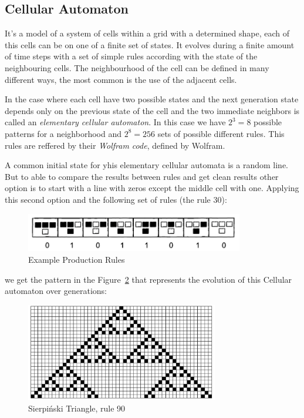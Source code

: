 
\subsection{Cellular Automaton} %
\label{sub:cellular_automaton}

It's a model of a system of cells within a grid with a determined shape, each of this cells can be on one of a finite set of states. It evolves during a finite amount of time steps with a set of simple rules according with the state of the neighbouring cells.
The neighbourhood of the cell can be defined in many different ways, the most common is the use of the adjacent cells. 

In the case where each cell have two possible states and the next generation state depends only on the previous state of the cell and the two immediate neighbors is called an \emph{elementary cellular automaton}. In this case we have $2^3 = 8$ possible patterns for a neighborhood and $2^8 = 256$ sets of possible different rules. This rules are reffered by their \emph{Wolfram code}, defined by Wolfram. 

A common initial state for yhis elementary cellular automata is a random line. But to able to compare the results between rules and get clean results other option is to start with a line with zeros except the middle cell with one. Applying this second option and the following set of rules (the rule 30):

\begin{figure}[htbp]
	\centering
	\includegraphics[width=0.85\textwidth]{img/Theory/Cellular_A/Rules.png}
	\caption{Example Production Rules\cite{Shiffman2012}}
	\label{fig:label}
\end{figure}

we get the pattern in the Figure~\ref{fig:resultCA} that represents the evolution of this Cellular automaton over generations:

\begin{figure}[H]
    \centering
    \includegraphics[width=0.75\textwidth]{img/Theory/Cellular_A/Result.png}
    \caption{Sierpiński Triangle, rule 90}
    \label{fig:resultCA}
\end{figure}


